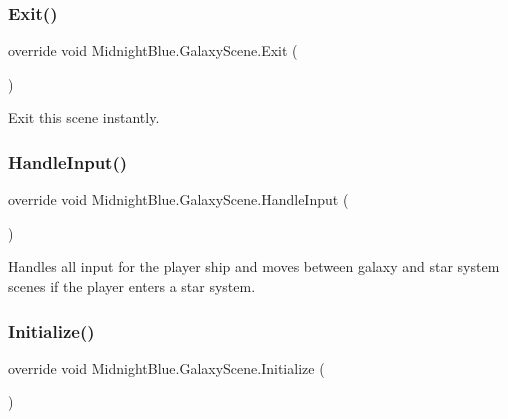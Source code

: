 \subsubsection{\texorpdfstring{Exit()}{Exit()}}
{\footnotesize\ttfamily override void Midnight\+Blue.\+Galaxy\+Scene.\+Exit (\begin{DoxyParamCaption}{ }\end{DoxyParamCaption})\hspace{0.3cm}{\ttfamily [inline]}}



Exit this scene instantly. 

\hypertarget{class_midnight_blue_1_1_galaxy_scene_afd7f8c9f6d0cf6ded10299d4b0015c29}{}\label{class_midnight_blue_1_1_galaxy_scene_afd7f8c9f6d0cf6ded10299d4b0015c29} 
\subsubsection{\texorpdfstring{Handle\+Input()}{HandleInput()}}
{\footnotesize\ttfamily override void Midnight\+Blue.\+Galaxy\+Scene.\+Handle\+Input (\begin{DoxyParamCaption}{ }\end{DoxyParamCaption})\hspace{0.3cm}{\ttfamily [inline]}}



Handles all input for the player ship and moves between galaxy and star system scenes if the player enters a star system. 

\hypertarget{class_midnight_blue_1_1_galaxy_scene_a97d97e56a73d9a4b7caf6dd6ce86647e}{}\label{class_midnight_blue_1_1_galaxy_scene_a97d97e56a73d9a4b7caf6dd6ce86647e} 
\subsubsection{\texorpdfstring{Initialize()}{Initialize()}}
{\footnotesize\ttfamily override void Midnight\+Blue.\+Galaxy\+Scene.\+Initialize (\begin{DoxyParamCaption}{ }\end{DoxyParamCaption})\hspace{0.3cm}{\ttfamily [inline]}}



